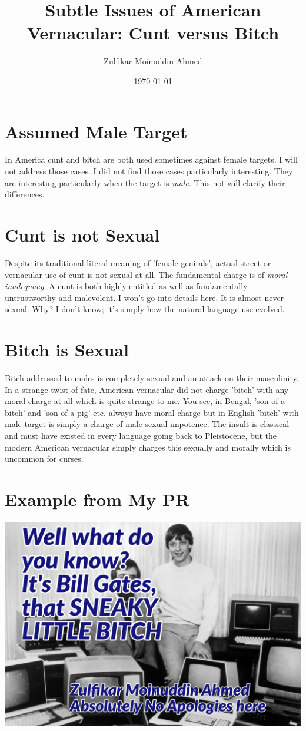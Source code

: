\documentclass{amsart}
\title{Subtle Issues of American Vernacular: Cunt versus Bitch}
\author{Zulfikar Moinuddin Ahmed}
\date{\today}
\begin{document}
\maketitle

\section{Assumed Male Target}

In America cunt and bitch are both used sometimes against female targets. I will not address those cases.  I did not find those cases particularly interesting.  They are interesting particularly when the target is {\em male}. This not will clarify their differences.

\section{Cunt is not Sexual}

Despite its traditional literal meaning of 'female genitals', actual street or vernacular use of cunt is not sexual at all.  The fundamental charge is of {\em moral inadequacy}.  A cunt is both highly entitled as well as fundamentally untrustworthy and malevolent.  I won't go into details here.  It is almost never sexual. Why?  I don't know; it's simply how the natural language use evolved.

\section{Bitch is Sexual}

Bitch addressed to males is completely sexual and an attack on their masculinity.  In a strange twist of fate, American vernacular did not charge 'bitch' with any moral charge at all which is quite strange to me.  You see, in Bengal, 'son of a bitch' and 'son of a pig' etc. always have moral charge but in English 'bitch' with male target is simply a charge of male sexual impotence.  The insult is classical and must have existed in every language going back to Pleistocene, but the modern American vernacular simply charges this sexually and morally which is uncommon for curses.

\section{Example from My PR}

\includegraphics[scale=0.6]{old.jpg}
\end{document}
